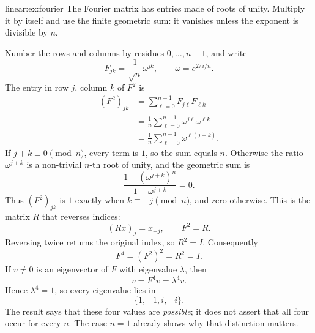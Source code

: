 \begin{solution}{linear:ex:fourier}
\idea The Fourier matrix has entries made of roots of unity. Multiply it by itself and use the finite geometric sum: it vanishes unless the exponent is divisible by $n$.

\writeup Number the rows and columns by residues $0,\ldots,n-1$, and write
\[
F_{jk}=\frac1{\sqrt n}\omega^{jk},
\qquad \omega=e^{2\pi i/n}.
\]
The entry in row $j$, column $k$ of $F^2$ is
\[
\begin{aligned}
(F^2)_{jk}
&=\sum_{\ell=0}^{n-1}F_{j\ell}F_{\ell k}\\
&=\frac1n\sum_{\ell=0}^{n-1}\omega^{j\ell}\omega^{\ell k}\\
&=\frac1n\sum_{\ell=0}^{n-1}\omega^{\ell(j+k)}.
\end{aligned}
\]
If $j+k\equiv0\pmod n$, every term is $1$, so the sum equals $n$. Otherwise the ratio $\omega^{j+k}$ is a non-trivial $n$-th root of unity, and the geometric sum is
\[
\frac{1-(\omega^{j+k})^n}{1-\omega^{j+k}}=0.
\]
Thus $(F^2)_{jk}$ is $1$ exactly when $k\equiv-j\pmod n$, and zero otherwise. This is the matrix $R$ that reverses indices:
\[
(Rx)_j=x_{-j},\qquad F^2=R.
\]
Reversing twice returns the original index, so $R^2=I$. Consequently
\[
F^4=(F^2)^2=R^2=I.
\]
If $v\ne0$ is an eigenvector of $F$ with eigenvalue $\lambda$, then
\[
v=F^4v=\lambda^4v.
\]
Hence $\lambda^4=1$, so every eigenvalue lies in
\[
\{1,-1,i,-i\}.
\]
The result says that these four values are \emph{possible}; it does not assert that all four occur for every $n$. The case $n=1$ already shows why that distinction matters.
\end{solution}

